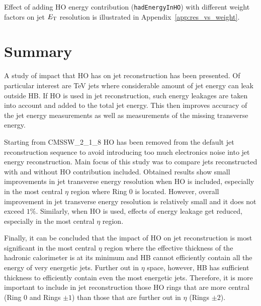 \documentclass{cmspaper}
\begin{document}
Effect of adding HO energy contribution (\texttt{hadEnergyInHO}) with different weight factors on jet $E_\text T$ resolution is illustrated in Appendix~\ref{app:res_vs_weight}.

\section{Summary}
\label{sc:summary}

A study of impact that HO has on jet reconstruction has been presented. Of particular interest are TeV jets where considerable amount of jet energy can leak outside HB. If HO is used in jet reconstruction, such energy leakages are taken into account and added to the total jet energy. This then improves accuracy of the jet energy measurements as well as measurements of the missing transverse energy.

Starting from CMSSW\_2\_1\_8 HO has been removed from the default jet reconstruction sequence to avoid introducing too much electronics noise into jet energy reconstruction. Main focus of this study was to compare jets reconstructed with and without HO contribution included. Obtained results show small improvements in jet transverse energy resolution when HO is included, especially in the most central $\eta$ region where Ring $0$ is located. However, overall improvement in jet transverse energy resolution is relatively small and it does not exceed $1\%$. Similarly, when HO is used, effects of energy leakage get reduced, especially in the most central $\eta$ region.

Finally, it can be concluded that the impact of HO on jet reconstruction is most significant in the most central $\eta$ region where the effective thickness of the hadronic calorimeter is at its minimum and HB cannot efficiently contain all the energy of very energetic jets. Further out in $\eta$ space, however, HB has sufficient thickness to efficiently contain even the most energetic jets. Therefore, it is more important to include in jet reconstruction those HO rings that are more central (Ring $0$ and Rings $\pm 1$) than those that are further out in $\eta$ (Rings $\pm 2$).
\end{document}
